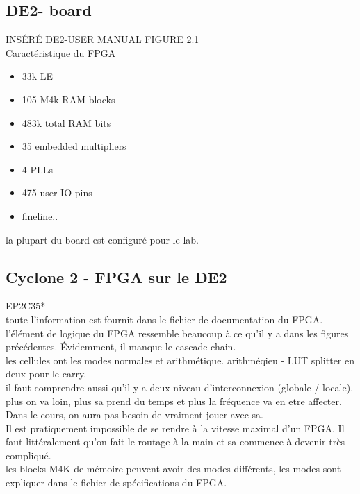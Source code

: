 \documentclass[oneside]{book}
\begin{document}
    \subsection{DE2- board}
    INSÉRÉ DE2-USER MANUAL FIGURE 2.1\\
    
    Caractéristique du FPGA\\
    \begin{itemize}
        \item 33k LE
        \item 105 M4k RAM blocks
        \item 483k total RAM bits
        \item 35 embedded multipliers
        \item 4 PLLs
        \item 475 user IO pins
        \item fineline..
    \end{itemize}
    
    la plupart du board est configuré pour le lab.\\
    
    \subsection{Cyclone 2 - FPGA sur le DE2}
    EP2C35*\\
    
    toute l'information est fournit dans le fichier de documentation du FPGA. l'élément de logique du FPGA ressemble beaucoup à ce qu'il y a dans les figures précédentes. Évidemment, il manque le cascade chain. \\
    
    les cellules ont les modes normales et arithmétique. arithméqieu  - LUT splitter en deux pour le carry.\\
    
    il faut comprendre aussi qu'il y a deux niveau d'interconnexion (globale / locale). plus on va loin, plus sa prend du temps et plus la fréquence va en etre affecter. Dans le cours, on aura pas besoin de vraiment jouer avec sa.\\
    
    Il est pratiquement impossible de se rendre à la vitesse maximal d'un FPGA. Il faut littéralement qu'on fait le routage à la main et sa commence à devenir très compliqué.\\
    
    les blocks M4K de mémoire peuvent avoir des modes différents, les modes sont expliquer dans le fichier de spécifications du FPGA.\\
    
\end{document}
